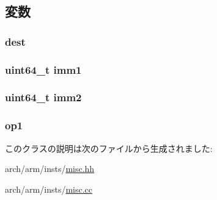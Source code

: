 \subsection{変数}
\hypertarget{classRegImmImmOp_aec72e8e45bdc87abeeeb75d2a8a9a716}{
\subsubsection[{dest}]{ {\bf dest}}}
\label{classRegImmImmOp_aec72e8e45bdc87abeeeb75d2a8a9a716}
\hypertarget{classRegImmImmOp_a846a1153344f66cc5d7c5af6fc071bb4}{
\subsubsection[{imm1}]{\setlength{\rightskip}{0pt plus 5cm}uint64\_\-t {\bf imm1}}}
\label{classRegImmImmOp_a846a1153344f66cc5d7c5af6fc071bb4}
\hypertarget{classRegImmImmOp_a4b3bca3d7461f9d143e9bcd456390a27}{
\subsubsection[{imm2}]{\setlength{\rightskip}{0pt plus 5cm}uint64\_\-t {\bf imm2}}}
\label{classRegImmImmOp_a4b3bca3d7461f9d143e9bcd456390a27}
\hypertarget{classRegImmImmOp_a4c465c43ad568f8bcf8ae71480e9cfea}{
\subsubsection[{op1}]{ {\bf op1}}}
\label{classRegImmImmOp_a4c465c43ad568f8bcf8ae71480e9cfea}


このクラスの説明は次のファイルから生成されました:\begin{DoxyCompactItemize}
\item 
arch/arm/insts/\hyperlink{arch_2arm_2insts_2misc_8hh}{misc.hh}\item 
arch/arm/insts/\hyperlink{arch_2arm_2insts_2misc_8cc}{misc.cc}\end{DoxyCompactItemize}
